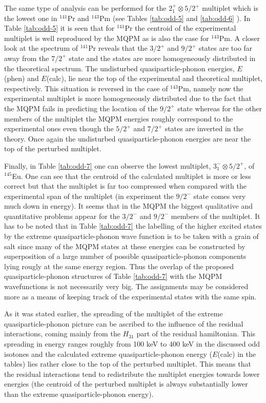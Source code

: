 The same type of analysis can be performed for the $2^+_1\otimes 5/2^+$ 
multiplet which is the lowest one in $^{141}$Pr and $^{143}$Pm (see Tables
\ref{tab:odd-5} and \ref{tab:odd-6} ). 
In Table \ref{tab:odd-5} it is seen that for
$^{141}$Pr the centroid of the experimental multiplet is well reproduced
by the MQPM as is also the case for $^{143}$Pm. A closer look at
the spectrum of $^{141}$Pr reveals that the $3/2^+$
and $9/2^+$ states are too far away from the $7/2^+$ state and the
states are more homogeneously distributed in the theoretical spectrum.
The undisturbed quasiparticle-phonon energies, $E$(phen) and $E$(calc),
lie near the top of the experimental and theoretical multiplet, 
respectively. This situation is reversed in the case of $^{143}$Pm, namely
now the experimental multiplet is more homogeneously distributed due
to the fact that the MQPM fails in predicting the location of the
$9/2^+$ state whereas for the other members of the multiplet the MQPM
energies roughly correspond to the experimental ones even though the
$5/2^+$ and $7/2^+$ states are inverted in the theory. Once again the
undisturbed quasiparticle-phonon energies are near the top of the perturbed
multiplet.

Finally, in Table \ref{tab:odd-7} 
one can observe the lowest multiplet,
$3^-_1\otimes 5/2^+$, of $^{145}$Eu. One can see that the centroid of the
calculated multiplet is more or less correct but that the multiplet
is far too compressed when compared with the experimental span of the
multiplet (in experiment the $9/2^-$ state comes very much down in
energy). It seems that in the MQPM the biggest qualitative and 
quantitative problems appear for the $3/2^-$ and $9/2^-$ members of
the multiplet. It has to be noted that in Table \ref{tab:odd-7} 
the labelling
of the higher excited states by the extreme quasiparticle-phonon wave function
is to be taken with a grain of salt since many of the MQPM states
at these energies can be constructed by superposition of a large number
of possible quasiparticle-phonon components lying rougly at the same
energy region. Thus the overlap of the proposed quasiparticle-phonon
structures of Table \ref{tab:odd-7} with the MQPM wavefunctions is not
necessarily very big. The assignments may be considered more as
a means of keeping track of the experimental states with the same spin.

As it was stated earlier, the spreading of the multiplet of the
extreme quasipar\-ti\-cle-phonon picture can be ascribed to the influence
of the residual interactions, coming mainly from the $H_{31}$ part
of the residual hamiltonian. This spreading in energy ranges roughly
from 100 keV to 400 keV in the discussed odd isotones and the 
calculated extreme quasiparticle-phonon energy ($E$(calc) in the tables)
lies rather close to the top of the perturbed multiplet. This means that
the residual interactions tend to redistribute the multiplet energies
towards lower energies (the centroid of the perturbed multiplet is always
substantially lower than the extreme quasiparticle-phonon energy). 

